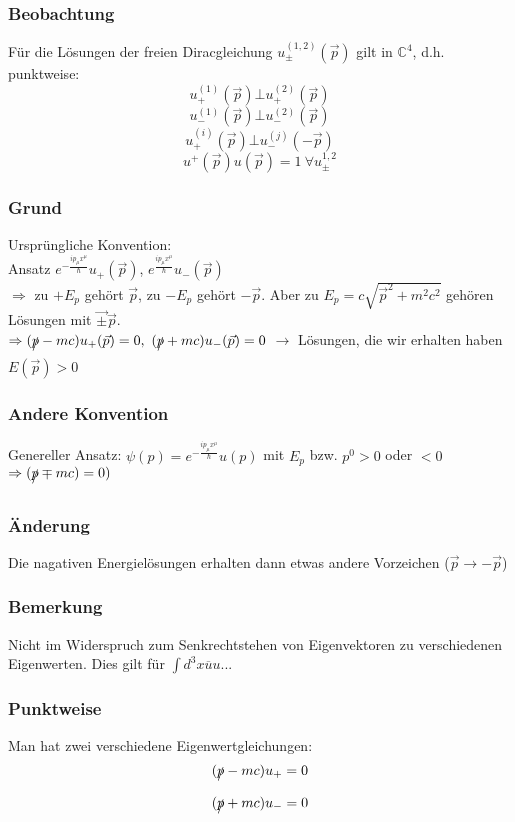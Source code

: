 \documentclass[twoside,a4paper]{scrartcl}
\newcommand{\C}{\mathbb{C}}
\renewcommand{\1}{\mathds{1}}
\newcommand{\Ra}{\Rightarrow}
\newcommand{\ra}{\rightarrow}
\renewcommand{\C}{\mathbb{C}}
\begin{document}
\subsubsection*{Beobachtung}
Für die Lösungen der freien Diracgleichung $u_{\pm}^{(1,2)}(\vec p)$ gilt in $\C^4$, d.h. punktweise:
$$u_+^{(1)}(\vec p) \bot u_+^{(2)}(\vec p)$$
$$u_-^{(1)}(\vec p) \bot u_-^{(2)}(\vec p)$$
$$u_+^{(i)}(\vec p) \bot u_-^{(j)}(-\vec p)$$
$$u^+(\vec p)u(\vec p)=1 \ \forall u_\pm^{1,2}$$

\subsubsection*{Grund}
Ursprüngliche Konvention:\\
Ansatz $e^{-\frac{i p_\mu x^\mu}{\hbar}}u_+(\vec p)$, $e^{\frac{i p_\mu x^\mu}{\hbar}}u_-(\vec p)$\\
$\Ra $ zu $+E_p$ gehört $\vec p$, zu $-E_p$ gehört $-\vec p$. Aber zu $E_p=c\sqrt{\vec p^2+m^2c^2}$ gehören Lösungen mit $\vec \pm \vec p$.\\
$\Ra (\xout{p}-mc)u_+(\vec p)=0, \ (\xout{p}+mc)u_-(\vec p)=0$
$\ra$ Lösungen, die wir erhalten haben $E(\vec p) >0$
\subsubsection*{Andere Konvention}
 Genereller Ansatz: $\psi(p)=e^{-\frac{i p_\mu x^\mu}{\hbar}}u(p)$ mit $E_p$ bzw. $p^0>0$ oder $<0$ $\Ra (\xout{p}\mp mc)=0)$
\subsubsection*{Änderung}
Die nagativen Energielösungen erhalten dann etwas andere Vorzeichen ($\vec p \ra -\vec p$)
\subsubsection*{Bemerkung}
Nicht im Widerspruch zum Senkrechtstehen von Eigenvektoren zu verschiedenen Eigenwerten. Dies gilt für $\int d^3x \overline {u}u...$
\subsubsection*{Punktweise}
Man hat zwei verschiedene Eigenwertgleichungen:
$$(\xout{p}-mc)u_+=0$$
$$(\xout{p}+mc)u_-=0$$
\end{document}
